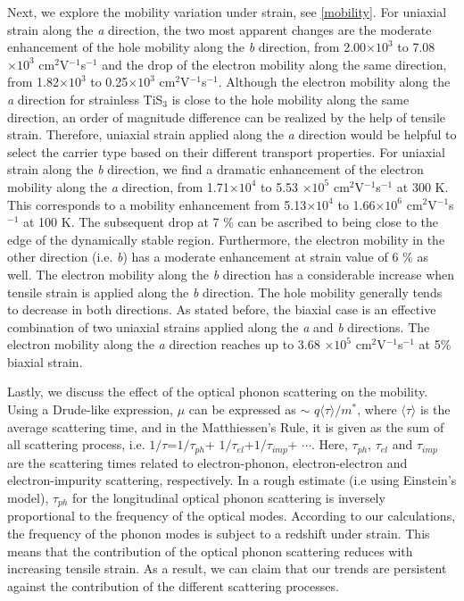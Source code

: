 Next, we explore the mobility variation under strain, see \autoref{mobility}. For uniaxial strain along the \textit{a} direction, the two most apparent changes are the moderate enhancement of the hole mobility along the \textit{b} direction, from 2.00$\times10^3$ to 7.08$\times10^3$ cm$^2$V$^{-1}$s$^{-1}$ and the drop of the electron mobility along the same direction, from 1.82$\times10^3$ to 0.25$\times10^3$ cm$^2$V$^{-1}$s$^{-1}$. Although the electron mobility along the \textit{a} direction for strainless TiS$_3$ is close to the hole mobility along the same direction, an order of magnitude difference can be realized by the help of tensile strain. Therefore,  uniaxial strain applied along the \textit{a} direction would be helpful to select the carrier type based on their different transport properties.  For uniaxial strain along the \textit{b} direction, we find a dramatic enhancement of the electron mobility along the \textit{a} direction, from 1.71$\times10^4$  to 5.53 $\times10^5$ cm$^2$V$^{-1}$s$^{-1}$ at 300 K. This corresponds to a mobility enhancement from 5.13$\times10^4$ to 1.66$\times10^6$ cm$^2$V$^{-1}$s$^{-1}$ at 100 K. The subsequent drop at 7 \% can be ascribed to being close to the edge of the dynamically stable region. Furthermore, the electron mobility in the other direction (i.e. \textit{b}) has a moderate enhancement at strain value of 6 \% as well. The electron mobility along the \textit{b} direction has a considerable increase when tensile strain is applied along the \textit{b} direction. The hole mobility generally tends to decrease in both directions.  As stated before, the biaxial case is an effective combination of two uniaxial strains applied along the \textit{a} and \textit{b} directions. The electron mobility along the \textit{a} direction reaches up to  3.68 $\times10^5$ cm$^2$V$^{-1}$s$^{-1}$ at 5\% biaxial strain. 

Lastly, we discuss the effect of the optical phonon scattering on the mobility.  Using a Drude-like expression, $\mu$ can be expressed as  $\sim$ $q\langle\tau\rangle/m^*$, where $\langle\tau\rangle$ is the average scattering time, and in the Matthiessen's Rule, it is given as the sum of all scattering process, i.e.  $1/\tau$=$1/\tau_{ph}$+ $1/\tau_{el}$+$1/\tau_{imp}$+ $\cdots$. Here, $\tau_{ph}$, $\tau_{el}$ and $\tau_{imp}$ are the scattering times related to electron-phonon, electron-electron and electron-impurity scattering, respectively.  In a rough estimate (i.e using Einstein's model), $\tau_{ph}$ for the longitudinal optical phonon scattering is inversely proportional  to the frequency of the optical modes. According to our calculations, the frequency of the phonon modes is subject to a redshift under strain. This means that the contribution of the optical phonon scattering reduces with increasing tensile strain.  As a result, we can claim that our trends are persistent against the contribution of the different scattering processes. 

